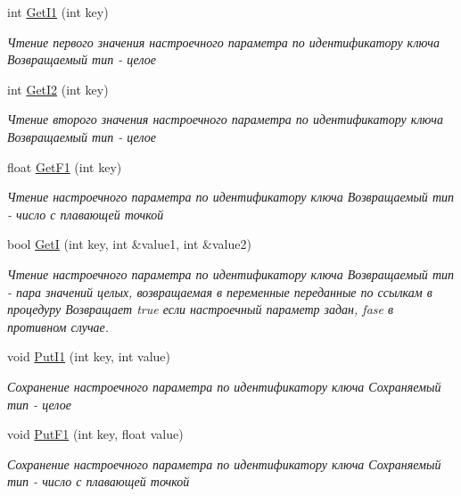\begin{DoxyCompactItemize}
\item 
int \hyperlink{class_c_v_i_engine_config_a41be84d81a153f85554171555094f20d}{Get\+I1} (int key)
\begin{DoxyCompactList}\small\item\em Чтение первого значения настроечного параметра по идентификатору ключа Возвращаемый тип -\/ целое \end{DoxyCompactList}\item 
int \hyperlink{class_c_v_i_engine_config_a249203b70b96db461c500b429fe047c5}{Get\+I2} (int key)
\begin{DoxyCompactList}\small\item\em Чтение второго значения настроечного параметра по идентификатору ключа Возвращаемый тип -\/ целое \end{DoxyCompactList}\item 
float \hyperlink{class_c_v_i_engine_config_a1f474cfcfadee9f76567fc84a10c5ad9}{Get\+F1} (int key)
\begin{DoxyCompactList}\small\item\em Чтение настроечного параметра по идентификатору ключа Возвращаемый тип -\/ число с плавающей точкой \end{DoxyCompactList}\item 
bool \hyperlink{class_c_v_i_engine_config_a7721cb9715f79730d622f7e9c930a333}{Get\+I} (int key, int \&value1, int \&value2)
\begin{DoxyCompactList}\small\item\em Чтение настроечного параметра по идентификатору ключа Возвращаемый тип -\/ пара значений целых, возвращаемая в переменные переданные по ссылкам в процедуру Возвращает true если настроечный параметр задан, fase в противном случае. \end{DoxyCompactList}\item 
void \hyperlink{class_c_v_i_engine_config_a5a4a7b7c7a9c1152998eabddf2ed020d}{Put\+I1} (int key, int value)
\begin{DoxyCompactList}\small\item\em Сохранение настроечного параметра по идентификатору ключа Сохраняемый тип -\/ целое \end{DoxyCompactList}\item 
void \hyperlink{class_c_v_i_engine_config_a6ac9297ee130cbf9b4d44bf812b3dd89}{Put\+F1} (int key, float value)
\begin{DoxyCompactList}\small\item\em Сохранение настроечного параметра по идентификатору ключа Сохраняемый тип -\/ число с плавающей точкой \end{DoxyCompactList}\item 

\end{DoxyCompactItemize}
